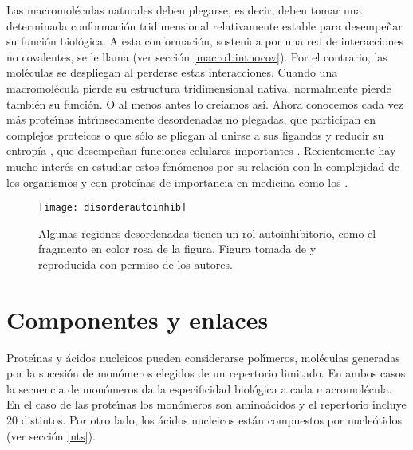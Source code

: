Las macromol\'{e}culas naturales deben plegarse, es decir, deben tomar una determinada conformaci\'{o}n 
tridimensional relativamente estable para desempe\~nar su funci\'{o}n biol\'{o}gica. 
A esta conformaci\'{o}n, sostenida por una red de interacciones no covalentes, se le llama  
(ver secci\'{o}n \ref{macro1:intnocov}).
Por el contrario, las mol\'{e}culas se despliegan al perderse estas interacciones. 
Cuando una macromol\'{e}cula pierde
su estructura tridimensional nativa, normalmente pierde tambi\'{e}n su funci\'{o}n. O al menos antes lo cre\'{i}amos as\'{i}.
Ahora conocemos cada vez m\'{a}s prote\'\i{}nas intr\'\i{}nsecamente desordenadas no plegadas, 
que participan en complejos proteicos o que s\'{o}lo se pliegan al unirse a sus ligandos y reducir su entrop\'{i}a \citep{Flock2014, Riback2017}, 
que desempe\~nan funciones celulares importantes \citep{Dyson1999}. Recientemente hay mucho inter\'{e}s en estudiar estos fen\'{o}menos 
por su relaci\'{o}n con la complejidad de los organismos \citep{Yruela2017} y con prote\'{i}nas de importancia en medicina como los 
 \citep{Sabate2015}.


\begin{figure}
\begin{center} 
\texttt{[image: disorderautoinhib]}
\caption%
{
Algunas regiones desordenadas tienen un rol autoinhibitorio, como el fragmento en color rosa de la figura.  
Figura tomada de \cite{Trudeau2013} y reproducida con permiso de los autores.
}
\label{fig:autoinhdis}
\end{center}
\end{figure}



\section{Componentes y enlaces}

Prote\'\i{}nas y \'{a}cidos nucleicos pueden considerarse pol\'\i{}meros, mol\'{e}culas generadas por la sucesi\'{o}n de mon\'{o}meros
elegidos de un repertorio limitado. En ambos casos la secuencia de mon\'{o}meros da la especificidad biol\'{o}gica 
a cada macromol\'{e}cula. En el caso de las prote\'\i{}nas los mon\'{o}meros son amino\'{a}cidos y el repertorio
incluye  
20 distintos. Por otro lado, los \'{a}cidos nucleicos est\'{a}n compuestos por nucle\'{o}tidos (ver secci\'{o}n \ref{nts}).

